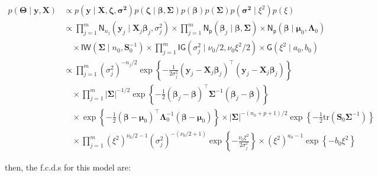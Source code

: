 \begin{equation}
\begin{split}
    \label{POST_HLRM}
    p(\bm{\Theta} \mid\bm{y}, \bm{X}) 
    &\propto p(\bm{y} \mid \bm{X}, \bm{\zeta} ,\bm{\sigma^2}) 
p(\bm{\zeta} \mid \bm{\beta}, \bm{\Sigma}) 
p(\bm{\beta}) 
p(\bm{\Sigma}) 
p(\bm{\sigma^2}\mid 
\xi^2)
p(\xi)\\
&\propto \prod_{j=1}^{m}\mathsf{N}_{n_j}(\bm{y}_{j}\mid\bm{X}_{j} \bm{\beta}_j,{\sigma}_j^2)\times\prod_{j=1}^{m}\mathsf{N_p}(\bm{\beta}_j \mid \bm{\beta}, \bm{\Sigma})\times\mathsf{N_p}(\bm{\beta}\mid\bm{\mu}_0, \bm{\Lambda}_0)\\
&\quad\times\mathsf{IW}\left(\bm{\Sigma}\mid n_0, \mathbf{S}_0^{-1}\right)\times\prod_{j=1}^{m}\mathsf{IG}\left(\sigma_j^2 \mid\nu_0 / 2, \nu_0 \xi^2 / 2\right)\times\mathsf{G}\left(\xi^2 \mid a_0, b_0\right)\\
&\propto \prod_{j=1}^{m}  ({\sigma}_j^2)^{-n_j/2} 
\exp\left\{ -\frac{1}{2\sigma_j^2} (\bm{y}_{j} - \bm{X}_{j} \bm{\beta}_j)^\top(\bm{y}_{j} - \bm{X}_{j} \bm{\beta}_j) \right\} \\
&\quad\times \prod_{j=1}^{m} \left| \bm{\Sigma} \right|^{-1/2} 
\exp\left\{ -\frac{1}{2} (\bm{\beta}_j -  \bm{\beta})^\top \bm{\Sigma}^{-1} (\bm{\beta}_j - \bm{\beta}) \right\} \\
&\quad \times \exp\left\{ -\frac{1}{2} (\bm{\beta} - \bm{\mu}_0)^\top \bm{\Lambda}_0^{-1} (\bm{\beta} - \bm{\mu}_0) \right\}
\times |\bm{\Sigma}|^{-(n_0 + p + 1)/2} 
 \exp\left\{ -\frac{1}{2} \mathrm{tr}(\bm{S}_0 \bm{\Sigma}^{-1}) \right\} \\
&\quad \times \prod_{j=1}^{m} (\xi^2)^{\nu_0 / 2 - 1} 
(\sigma_j^2)^{-(\nu_0 / 2+1)} 
\exp\left\{ -\frac{\nu_0 \xi^2}{2 \sigma_j^2} \right\} 
\times (\xi^2)^{a_0 - 1} \exp\left\{ -b_0 \xi^2 \right\}
\end{split}
\end{equation}

then, the f.c.d.s for this model are:

